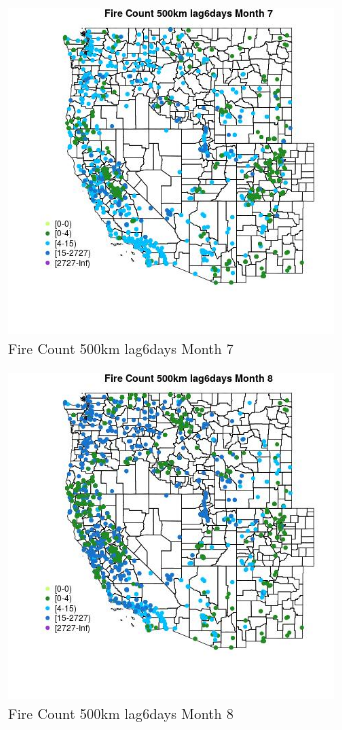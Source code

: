 \begin{figure} 
\centering  
\includegraphics[width=0.77\textwidth]{Code_Outputs/Report_ML_input_PM25_Step4_part_f_de_duplicated_aveswNAs_MapObsMo7Fire_Count_500km_lag6days.jpg} 
\caption{\label{fig:Report_ML_input_PM25_Step4_part_f_de_duplicated_aveswNAsMapObsMo7Fire_Count_500km_lag6days}Fire Count 500km lag6days Month 7} 
\end{figure} 
 

\begin{figure} 
\centering  
\includegraphics[width=0.77\textwidth]{Code_Outputs/Report_ML_input_PM25_Step4_part_f_de_duplicated_aveswNAs_MapObsMo8Fire_Count_500km_lag6days.jpg} 
\caption{\label{fig:Report_ML_input_PM25_Step4_part_f_de_duplicated_aveswNAsMapObsMo8Fire_Count_500km_lag6days}Fire Count 500km lag6days Month 8} 
\end{figure} 
 

